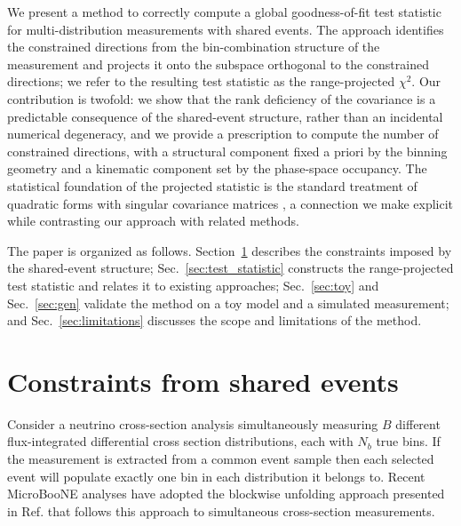 \documentclass[a4paper,11pt]{article}
\begin{document}
We present a method to correctly compute a global goodness-of-fit test statistic for multi-distribution measurements with shared events. The approach identifies the constrained directions from the bin-combination structure of the measurement and projects it onto the subspace orthogonal to the constrained directions; we refer to the resulting test statistic as the range-projected $\chi^2$. Our contribution is twofold: we show that the rank deficiency of the covariance is a predictable consequence of the shared-event structure, rather than an incidental numerical degeneracy, and we provide a prescription to compute the number of constrained directions, with a structural component fixed a priori by the binning geometry and a kinematic component set by the phase-space occupancy. The statistical foundation of the projected statistic is the standard treatment of quadratic forms with singular covariance matrices \cite{Rao:1971}, a connection we make explicit while contrasting our approach with related methods.

The paper is organized as follows. Section~\ref{sec:constraints} describes the constraints imposed by the shared-event structure; Sec.~\ref{sec:test_statistic} constructs the range-projected test statistic and relates it to existing approaches; Sec.~\ref{sec:toy} and Sec.~\ref{sec:gen} validate the method on a toy model and a simulated measurement; and Sec.~\ref{sec:limitations} discusses the scope and limitations of the method.

\section{Constraints from shared events}
\label{sec:constraints}

Consider a neutrino cross-section analysis simultaneously measuring $B$ different flux-integrated differential cross section distributions, each with $N_b$ true bins. If the measurement is extracted from a common event sample then each selected event will populate exactly one bin in each distribution it belongs to. Recent MicroBooNE analyses \cite{MicroBooNE:2024yzp,MicroBooNE:2024zwf,MicroBooNE:2024pdj} have adopted the blockwise unfolding approach presented in Ref. \cite{Gardiner:2024gdy} that follows this approach to simultaneous cross-section measurements.
\end{document}
